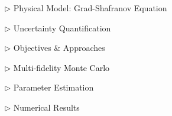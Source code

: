 \documentclass{beamer}
\begin{document}
\begin{frame}[c]
\large 	
\textcolor{mygray1}{
    \begin{itemize}[leftmargin=5pt] 
        \item[$\triangleright$]  Physical Model: Grad-Shafranov Equation
        \vspace{0.2cm}	
        \item[$\triangleright$] Uncertainty Quantification
        \vspace{0.2cm}
        \item[$\triangleright$]  Objectives \& Approaches
        \vspace{0.2cm}
        \item[\textcolor{black}{$\triangleright$}] \textcolor{black}{\fontsize{25}{60}\selectfont Multi-fidelity Monte Carlo}
        \vspace{0.2cm}
        \item[$\triangleright$] Parameter Estimation
        \vspace{0.2cm}
        \item[$\triangleright$] Numerical Results
    \end{itemize}
}
\end{frame}
\end{document}
